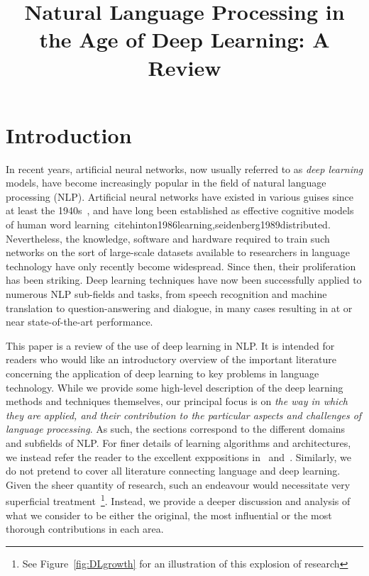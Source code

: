 \documentclass[11pt,letterpaper]{article}
\title{Natural Language Processing in the Age of Deep Learning: A Review}
\date{}
\begin{document}
\maketitle

\begin{abstract}

\end{abstract}


\section{Introduction}

In recent years, artificial neural networks, now usually referred to as \emph{deep learning} models, have become increasingly popular in the field of natural language processing (NLP). Artificial neural networks have existed in various guises since at least the 1940s~\cite{mcculloch1943logical}, and have long been established as effective cognitive models of human word learning~cite{hinton1986learning,seidenberg1989distributed}. Nevertheless, the knowledge, software and hardware required to train such networks on the sort of large-scale datasets available to researchers in language technology have only recently become widespread. Since then, their proliferation has been striking. Deep learning techniques have now been successfully applied to numerous NLP sub-fields and tasks, from speech recognition and machine translation to question-answering and dialogue, in many cases resulting in at or near state-of-the-art performance.  

This paper is a review of the use of deep learning in NLP. It is intended for readers who would like an introductory overview of the important literature concerning the application of deep learning to key problems in language technology. While we provide some high-level description of the deep learning methods and techniques themselves, our principal focus is on \emph{the way in which they are applied, and their contribution to the particular aspects and challenges of language processing}. As such, the sections correspond to the different domains and subfields of NLP. For finer details of learning algorithms and architectures, we instead refer the reader to the excellent exppositions in~\cite{Goodfellow-et-al-2016-Book} and~\cite{goldberg2015primer}. Similarly, we do not pretend to cover all literature connecting language and deep learning. Given the sheer quantity of research, such an endeavour would necessitate very superficial treatment~\footnote{See Figure~\ref{fig:DLgrowth} for an illustration of this explosion of research}. Instead, we provide a deeper discussion and analysis of what we consider to be either the original, the most influential or the most thorough contributions in each area. 
\end{document}
